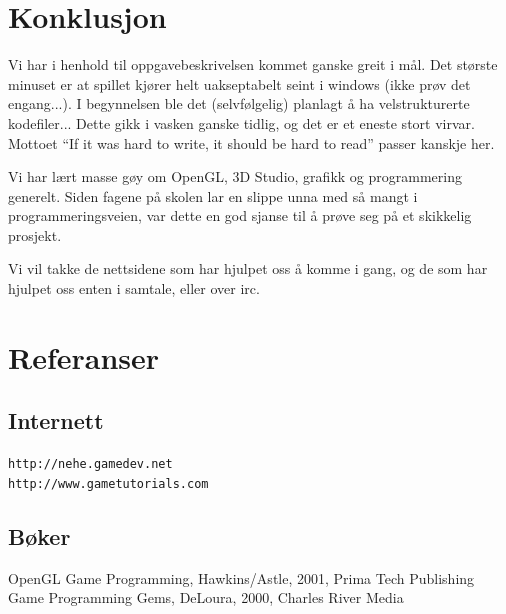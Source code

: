 \documentclass[11pt, dvips]{report}
\begin{document}
\chapter{Konklusjon}

Vi har i henhold til oppgavebeskrivelsen kommet ganske greit i mål.
Det største minuset er at spillet kjører helt uakseptabelt seint i
windows (ikke prøv det engang...). I begynnelsen ble det
(selvfølgelig) planlagt å ha velstrukturerte kodefiler... Dette gikk i
vasken ganske tidlig, og det er et eneste stort virvar. Mottoet ``If
it was hard to write, it should be hard to read'' passer kanskje
her.

Vi har lært masse gøy om OpenGL, 3D Studio, grafikk og programmering
generelt. Siden fagene på skolen lar en slippe unna med så mangt i
programmeringsveien, var dette en god sjanse til å prøve seg på et
skikkelig prosjekt.

Vi vil takke de nettsidene som har hjulpet oss å komme i gang, og de
som har hjulpet oss enten i samtale, eller over irc.

\chapter{Referanser}

\section{Internett}

{\tt http://nehe.gamedev.net\\
http://www.gametutorials.com}

\section{Bøker}
OpenGL Game Programming, Hawkins/Astle, 2001, Prima Tech
Publishing\\[1em]
Game Programming Gems, DeLoura, 2000, Charles River Media
\end{document}
